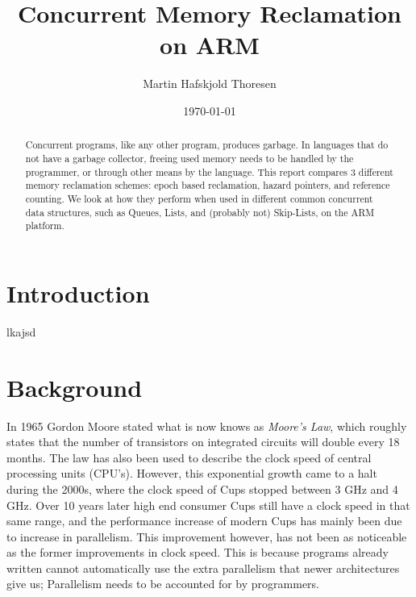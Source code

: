 \documentclass[a4paper,twoside]{report}
\begin{document}
\title{Concurrent Memory Reclamation on ARM}
\author{Martin Hafskjold Thoresen}
\date{\today}
\maketitle



\begin{abstract}
  Concurrent programs, like any other program, produces garbage.  In languages
  that do not have a garbage collector, freeing used memory needs to be
  handled by the programmer, or through other means by the language.  This
  report compares 3 different memory reclamation schemes: epoch based
  reclamation, hazard pointers, and reference counting.  We look at how they
  perform when used in different common concurrent data structures, such as
  Queues, Lists, and (probably not) Skip-Lists, on the ARM platform.
\end{abstract}

\chapter{Introduction}

lkajsd

\tableofcontents

\chapter{Background}

In 1965 Gordon Moore stated what is now knows as \emph{Moore's Law}, which
roughly states that the number of transistors on integrated circuits will
double every 18 months.  The law has also been used to describe the clock speed
of central processing units (CPU's).  However, this exponential growth came to a
halt during the 2000s, where the clock speed of Cups stopped between 3 GHz and
4 GHz.  Over 10 years later high end consumer Cups still have a clock speed in
that same range, and the performance increase of modern Cups has mainly been
due to increase in parallelism.  This improvement however, has not been as
noticeable as the former improvements in clock speed. This is because programs
already written cannot automatically use the extra parallelism that newer
architectures give us; Parallelism needs to be accounted for by programmers.
\end{document}
